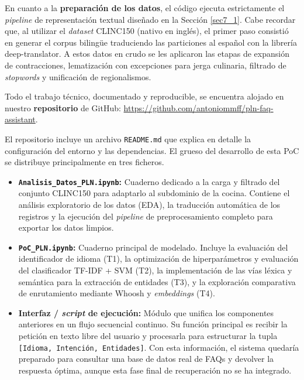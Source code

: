 \documentclass[11pt,a4paper,twoside]{article}
\theoremstyle{definition}
\numberwithin{equation}{section}
\begin{document}
En cuanto a la \textbf{preparación de los datos}, el código ejecuta estrictamente el \textit{pipeline} de representación textual diseñado en la Sección \ref{sec7_1}. Cabe recordar que, al utilizar el \textit{dataset} CLINC150 (nativo en inglés), el primer paso consistió en generar el corpus bilingüe traduciendo las particiones al español con la librería deep-translator. A estos datos en crudo se les aplicaron las etapas de expansión de contracciones, lematización con excepciones para jerga culinaria, filtrado de \textit{stopwords} y unificación de regionalismos.

Todo el trabajo técnico, documentado y reproducible, se encuentra alojado en nuestro \textbf{repositorio} de GitHub: \href{https://github.com/antoniommff/pln-faq-assistant}{https://github.com/antoniommff/pln-faq-assistant}.

El repositorio incluye un archivo \verb|README.md| que explica en detalle la configuración del entorno y las dependencias. El grueso del desarrollo de esta PoC se distribuye principalmente en tres ficheros.
\begin{itemize}
	\item \textbf{\texttt{Analisis\_Datos\_PLN.ipynb}:} Cuaderno dedicado a la carga y filtrado del conjunto CLINC150 para adaptarlo al subdominio de la cocina. Contiene el análisis exploratorio de los datos (EDA), la traducción automática de los registros y la ejecución del \textit{pipeline} de preprocesamiento completo para exportar los datos limpios.
	
	\item \textbf{\texttt{PoC\_PLN.ipynb}:} Cuaderno principal de modelado. Incluye la evaluación del identificador de idioma (T1), la optimización de hiperparámetros y evaluación del clasificador TF-IDF + SVM (T2), la implementación de las vías léxica y semántica para la extracción de entidades (T3), y la exploración comparativa de enrutamiento mediante Whoosh y \textit{embeddings} (T4).
	
	\item \textbf{Interfaz / \textit{script} de ejecución:} Módulo que unifica los componentes anteriores en un flujo secuencial continuo. Su función principal es recibir la petición en texto libre del usuario y procesarla para estructurar la tupla \texttt{[Idioma, Intención, Entidades]}. Con esta información, el sistema quedaría preparado para consultar una base de datos real de FAQs y devolver la respuesta óptima, aunque esta fase final de recuperación no se ha integrado.
\end{itemize}
\end{document}
